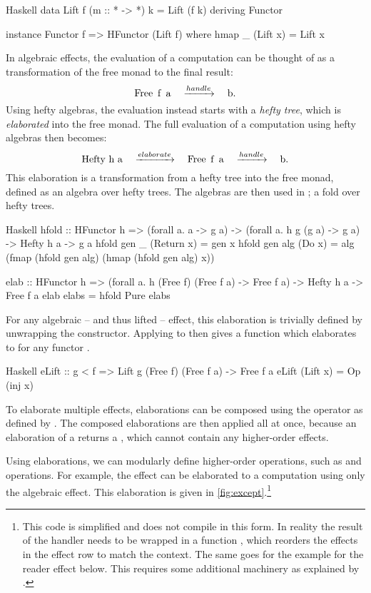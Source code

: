 \begin{lst}{Haskell}
data Lift f (m :: * -> *) k = Lift (f k)
  deriving Functor

instance Functor f => HFunctor (Lift f) where
  hmap _ (Lift x) = Lift x
\end{lst}
%
In algebraic effects, the evaluation of a computation can be thought of as a transformation of the free monad to the final result: 
\[
    \mcode{Free f a} \quad\xrightarrow{handle}\quad \mcode{b}.
\]
Using hefty algebras, the evaluation instead starts with a \emph{hefty tree}, which is \emph{elaborated} into the free monad. The full evaluation of a computation using hefty algebras then becomes:
\[
    \mcode{Hefty h a} \quad\xrightarrow{elaborate}\quad \mcode{Free f a} \quad\xrightarrow{handle}\quad \mcode{b}.
\]
This elaboration is a transformation from a hefty tree into the free monad, defined as an algebra over hefty trees. The algebras are then used in ; a fold over hefty trees.

\begin{lst}{Haskell}
hfold :: HFunctor h
      => (forall a. a -> g a)
      -> (forall a. h g (g a) -> g a)
      -> Hefty h a 
      -> g a
hfold gen _   (Return x) = gen x
hfold gen alg (Do x)     =
  alg (fmap (hfold gen alg) (hmap (hfold gen alg) x))

elab :: HFunctor h
     => (forall a. h (Free f) (Free f a) -> Free f a)
     -> Hefty h a
     -> Free f a
elab elabs = hfold Pure elabs
\end{lst}
%
For any algebraic -- and thus lifted -- effect, this elaboration  is trivially defined by unwrapping the  constructor. Applying  to  then gives a function which elaborates  to  for any functor . 

\begin{lst}{Haskell}
eLift :: g < f => Lift g (Free f) (Free f a) -> Free f a
eLift (Lift x) = Op (inj x)
\end{lst}
%
To elaborate multiple effects, elaborations can be composed using the \hs{^} operator as defined by \textcite{bach_poulsen_hefty_2023}. The composed elaborations are then applied all at once, because an elaboration of a  returns a , which cannot contain any higher-order effects.

Using elaborations, we can modularly define higher-order operations, such as  and  operations. For example, the  effect can be elaborated to a computation using only the algebraic  effect. This elaboration is given in \cref{fig:except}.\footnote{This code is simplified and does not compile in this form. In reality the result of the handler needs to be wrapped in a function , which reorders the effects in the effect row to match the context. The same goes for the example for the reader effect below. This  requires some additional machinery as explained by \textcite{bach_poulsen_encoding_2023}.}


